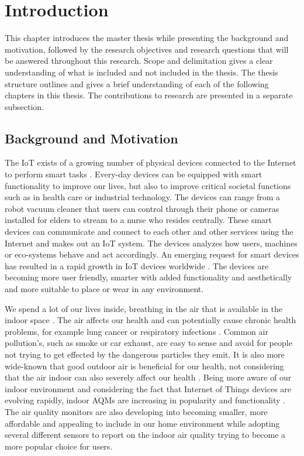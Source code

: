 \chapter{Introduction}
This chapter introduces the master thesis while presenting the background and motivation, followed by the research objectives and research questions that will be answered throughout this research. Scope and delimitation gives a clear understanding of what is included and not included in the thesis. The thesis structure outlines and gives a brief understanding of each of the following chapters in this thesis. The contributions to research are presented in a separate subsection. 

\section{Background and Motivation}
The \gls{IoT} exists of a growing number of physical devices connected to the Internet to perform smart tasks \cite{IoTSurveyAl-Fuqaha}. Every-day devices can be equipped with smart functionality to improve our lives, but also to improve critical societal functions such as in health care or industrial technology. The devices can range from a robot vacuum cleaner that users can control through their phone or cameras installed for elders to stream to a nurse who resides centrally. These smart devices can communicate and connect to each other and other services using the Internet and makes out an \gls{IoT} system. The devices analyzes how users, machines or eco-systems behave and act accordingly. An emerging request for smart devices has resulted in a rapid growth in \gls{IoT} devices worldwide \cite{IoTAndPrivacy}. The devices are becoming more user friendly, smarter with added functionality and aesthetically and more suitable to place or wear in any environment. 

We spend a lot of our lives inside, breathing in the air that is available in the indoor space \cite{IndoorAirQualityMonitorIoT}. The air affects our health and can potentially cause chronic health problems, for example lung cancer or respiratory infections \cite{IAQMonitorReview}. Common air pollution's, such as smoke or car exhaust, are easy to sense and avoid for people not trying to get effected by the dangerous particles they emit. It is also more wide-known that good outdoor air is beneficial for our health, not considering that the air indoor can also severely affect our health \cite{IndoorAirQuality}. Being more aware of our indoor environment and considering the fact that Internet of Things devices are evolving rapidly, indoor \gls{AQM}s are increasing in popularity and functionality \cite{SecurityAndDataIntInAQM}. The air quality monitors are also developing into becoming smaller, more affordable and appealing to include in our home environment while adopting several different sensors to report on the indoor air quality trying to become a more popular choice for users. 

